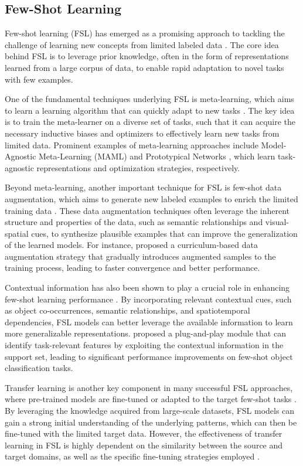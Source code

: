 \documentclass[11pt]{article}
\begin{document}
\subsection{Few-Shot Learning}

Few-shot learning (FSL) has emerged as a promising approach to tackling the challenge of learning new concepts from limited labeled data \cite{ref109}. The core idea behind FSL is to leverage prior knowledge, often in the form of representations learned from a large corpus of data, to enable rapid adaptation to novel tasks with few examples.

One of the fundamental techniques underlying FSL is meta-learning, which aims to learn a learning algorithm that can quickly adapt to new tasks \cite{ref110}. The key idea is to train the meta-learner on a diverse set of tasks, such that it can acquire the necessary inductive biases and optimizers to effectively learn new tasks from limited data. Prominent examples of meta-learning approaches include Model-Agnostic Meta-Learning (MAML) \cite{ref111} and Prototypical Networks \cite{ref112}, which learn task-agnostic representations and optimization strategies, respectively.

Beyond meta-learning, another important technique for FSL is few-shot data augmentation, which aims to generate new labeled examples to enrich the limited training data \cite{ref113}. These data augmentation techniques often leverage the inherent structure and properties of the data, such as semantic relationships and visual-spatial cues, to synthesize plausible examples that can improve the generalization of the learned models. For instance, \cite{ref113} proposed a curriculum-based data augmentation strategy that gradually introduces augmented samples to the training process, leading to faster convergence and better performance.

Contextual information has also been shown to play a crucial role in enhancing few-shot learning performance \cite{ref33,ref34}. By incorporating relevant contextual cues, such as object co-occurrences, semantic relationships, and spatiotemporal dependencies, FSL models can better leverage the available information to learn more generalizable representations. \cite{ref33} proposed a plug-and-play module that can identify task-relevant features by exploiting the contextual information in the support set, leading to significant performance improvements on few-shot object classification tasks.

Transfer learning is another key component in many successful FSL approaches, where pre-trained models are fine-tuned or adapted to the target few-shot tasks \cite{ref114,ref115}. By leveraging the knowledge acquired from large-scale datasets, FSL models can gain a strong initial understanding of the underlying patterns, which can then be fine-tuned with the limited target data. However, the effectiveness of transfer learning in FSL is highly dependent on the similarity between the source and target domains, as well as the specific fine-tuning strategies employed \cite{ref116}.
\end{document}

